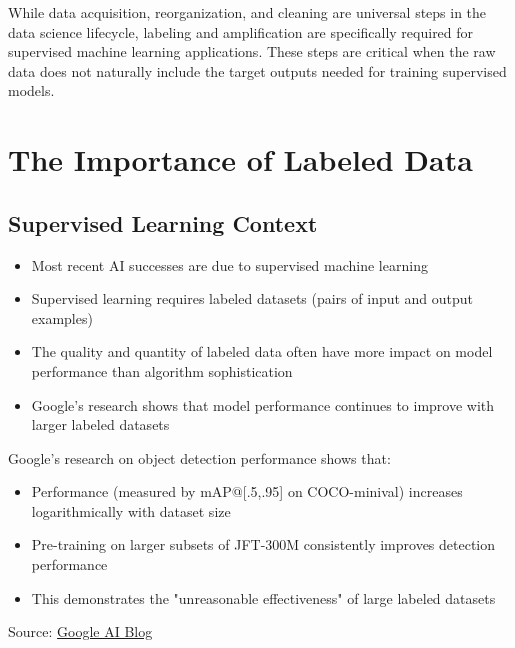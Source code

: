 \documentclass[12pt]{article}
\begin{document}
\begin{tcolorbox}[colback=yellow!5!white,colframe=yellow!75!black,title={Key Insight}]
While data acquisition, reorganization, and cleaning are universal steps in the data science lifecycle, labeling and amplification are specifically required for supervised machine learning applications. These steps are critical when the raw data does not naturally include the target outputs needed for training supervised models.
\end{tcolorbox}

\section{The Importance of Labeled Data}

\subsection{Supervised Learning Context}
\begin{itemize}
    \item Most recent AI successes are due to supervised machine learning
    \item Supervised learning requires labeled datasets (pairs of input and output examples)
    \item The quality and quantity of labeled data often have more impact on model performance than algorithm sophistication
    \item Google's research shows that model performance continues to improve with larger labeled datasets
\end{itemize}

\begin{tcolorbox}[colback=blue!5!white,colframe=blue!75!black,title={Research Example}]
Google's research on object detection performance shows that:
\begin{itemize}
    \item Performance (measured by mAP@[.5,.95] on COCO-minival) increases logarithmically with dataset size
    \item Pre-training on larger subsets of JFT-300M consistently improves detection performance
    \item This demonstrates the "unreasonable effectiveness" of large labeled datasets
\end{itemize}
Source: \href{https://ai.googleblog.com/2017/07/revisiting-unreasonable-effectiveness.html}{Google AI Blog}
\end{tcolorbox}
\end{document}
